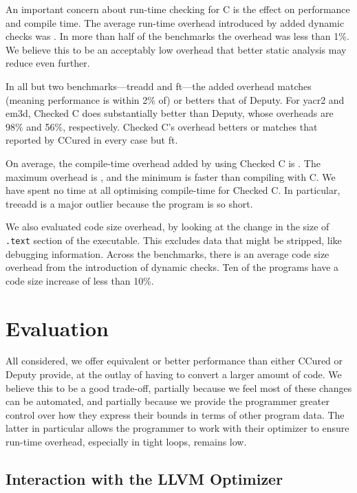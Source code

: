 An important concern about run-time checking for C is the effect on
performance and compile time. The average run-time overhead introduced
by added dynamic checks was \ResultRunTimeMean. In more than half of
the benchmarks the overhead was less than 1\%. We believe this to be
an acceptably low overhead that better static analysis may reduce even
further.

In all but two benchmarks---treadd and ft---the added overhead matches
(meaning performance is within 2\% of) or betters that of Deputy. For
yacr2 and em3d, Checked C does substantially better than Deputy, whose
overheads are 98\% and 56\%, respectively. Checked C's overhead
betters or matches that reported by CCured in every case but ft.

On average, the compile-time overhead added by using Checked C is
\ResultCompileTimeMean. The maximum overhead is \ResultCompileTimeMax,
and the minimum is \ResultCompileTimeMin faster than compiling with C.
We have spent no time at all optimising compile-time for Checked C. In
particular, treeadd is a major outlier because the program is so
short.

We also evaluated code size overhead, by looking at the change in the
size of \lstinline|.text| section of the executable. This excludes data
that might be stripped, like debugging information. Across the
benchmarks, there is an average \ResultExecutableSizeMean code size
overhead from the introduction of dynamic checks. Ten of the programs
have a code size increase of less than 10\%.

\section{Evaluation}

All considered, we offer equivalent or better performance than either
CCured or Deputy provide, at the outlay of having to convert a larger
amount of code. We believe this to be a good trade-off, partially
because we feel most of these changes can be automated, and partially
because we provide the programmer greater control over how they
express their bounds in terms of other program data. The latter in
particular allows the programmer to work with their optimizer to
ensure run-time overhead, especially in tight loops, remains low.

\subsection{Interaction with the LLVM Optimizer}

